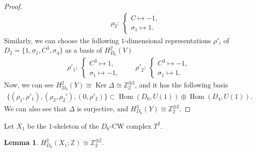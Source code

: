 \documentclass[pdftex]{sigma}
\newtheorem{lem}[thm]{Lemma}
\theoremstyle{definition}
\newcommand{\Z}{\mathbb{Z}}
\begin{document}
\begin{proof}
\begin{gather*}
\qquad
\rho_2 \colon \
\begin{cases}
C \mapsto -1, \\
\sigma_1 \mapsto 1.
\end{cases}
\end{gather*}
Similarly, we can choose the following $1$-dimensional representations $\rho'_i$ of $D_2 = \{ 1, \sigma_1, C^3, \sigma_4 \}$ as a basis of $H^2_{D_6}(V)$
\begin{gather*}
\rho'_1 \colon \
\begin{cases}
C^3 \mapsto 1, \\
\sigma_1 \mapsto -1,
\end{cases}
\qquad
\rho'_2 \colon \
\begin{cases}
C^3 \mapsto -1, \\
\sigma_1 \mapsto 1.
\end{cases}
\end{gather*}
Now, we can see $H^2_{D_6}(Y) \cong \operatorname{Ker}\Delta \cong \Z_2^{\oplus 3}$, and it has the following basis
\begin{gather*}
\{ (\rho_1, \rho'_1), (\rho_2, \rho_2'), (0, \rho'_2) \} \subset \operatorname{Hom}(D_6, U(1)) \oplus \operatorname{Hom}(D_4, U(1)).
\end{gather*}
We can also see that $\Delta$ is surjective, and $H^3_{D_6}(Y) \cong \Z_2^{\oplus 2}$.
\end{proof}

Let $X_1$ be the $1$-skeleton of the $D_6$-CW complex $T^2$.

\begin{lem}
$H^3_{D_6}(X_1; \Z) \cong \Z_2^{\oplus 2}$.
\end{lem}
\end{document}
